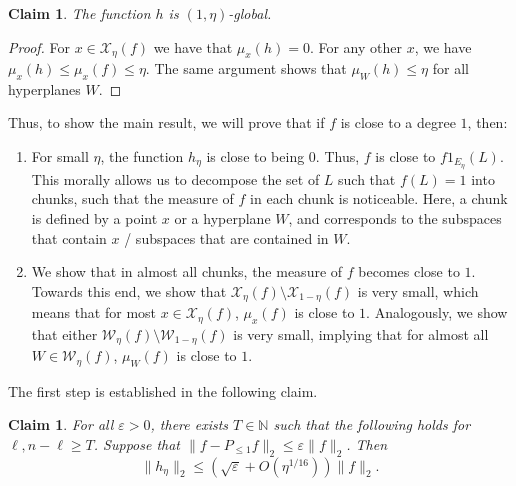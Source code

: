 \documentclass[11pt]{article}
\newtheorem{claim}[thm]{Claim}
\newcommand\norm[1]{\| #1 \|}
\newcommand\eps{\varepsilon}
\renewcommand\geq{\geqslant}
\renewcommand\leq{\leqslant}
\begin{document}
\begin{claim}\label{claim:h_global}
    The function $h$ is $(1,\eta)$-global.
\end{claim}
\begin{proof}
    For $x\in \mathcal{X}_{\eta}(f)$ we have that $\mu_x(h) = 0$. For any other $x$, we have $\mu_x(h)\leq \mu_x(f)\leq \eta$. The same argument shows that $\mu_W(h)\leq \eta$ for all hyperplanes $W$.
\end{proof}
Thus, to show the main result, we will prove that if $f$ is close to a degree $1$, then:
\begin{enumerate}
    \item For small $\eta$, the function $h_{\eta}$ is close to being $0$. Thus, 
    $f$ is close to $f1_{E_{\eta}}(L)$. This morally allows us to decompose the set of $L$ such that $f(L) = 1$ into chunks, such that the measure of $f$ in each chunk is noticeable. Here, a chunk is defined by a point $x$ or a hyperplane $W$, and corresponds to the subspaces that contain $x$ / subspaces that are contained in $W$. 
    \item We show that in almost all chunks, the measure of $f$ becomes close to $1$. Towards this end, we show that $\mathcal{X}_{\eta}(f)\setminus \mathcal{X}_{1-\eta}(f)$ is very small, which means that for most $x\in \mathcal{X}_{\eta}(f)$, $\mu_x(f)$ is close to $1$. Analogously, we show that either $\mathcal{W}_{\eta}(f)\setminus \mathcal{W}_{1-\eta}(f)$ is very small, implying that for almost all $W\in \mathcal{W}_{\eta}(f)$, $\mu_W(f)$ is close to $1$.
\end{enumerate}

The first step is established in the following claim.

\begin{claim}\label{claim:h_close_to_0}
   For all $\eps>0$, there exists $T\in\mathbb{N}$ such that the following holds for $\ell,n-\ell\geq T$. Suppose that $\norm{f-P_{\leq 1}f}_2\leq \eps \norm{f}_2$. Then
   \[
   \norm{h_{\eta}}_2
   \leq (\sqrt{\eps}+O(\eta^{1/16}))\norm{f}_2.
   \]
\end{claim}
\end{document}
